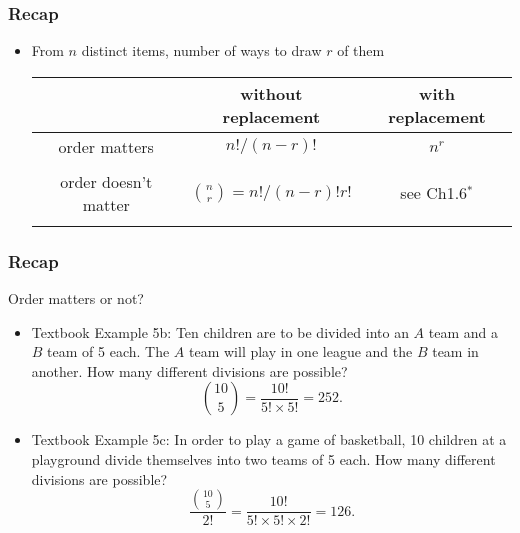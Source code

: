 \documentclass[slidestop,compress,mathserif]{beamer}
\begin{document}
\begin{frame}\frametitle{Recap}

\begin{itemize}

\item From $n$ distinct items, number of ways to draw $r$ of them
\begin{center}
\begin{tabular}{c|cc}
					& without replacement 			& with replacement \\
\hline				
order matters			& $n! / (n-r)!$					& $n^r$ \\
&&\\
order doesn't matter		& ${n \choose r} = n! / (n-r)!r!$		&  see Ch1.6$^*$\\
&&\\
\end{tabular}
\end{center}


\end{itemize}

\end{frame}

\begin{frame}\frametitle{Recap}
Order matters or not?
\pause
\begin{itemize}

\item Textbook Example 5b: Ten children are to be divided into an $A$ team and a $B$ team of 5 each. The $A$ team will play in one league and the $B$ team in another. How many different divisions are possible?
\pause
$${10 \choose 5} = \frac{10!}{5! \times 5!} = 252.$$
\pause

\item Textbook Example 5c: In order to play a game of basketball, 10 children at a playground divide themselves into two teams of 5 each. How many different divisions are possible?
\pause
$$\frac{{10 \choose 5}}{2!} = \frac{10!}{5! \times 5! \times 2!} = 126.$$

\end{itemize}
\end{frame}
\end{document}
